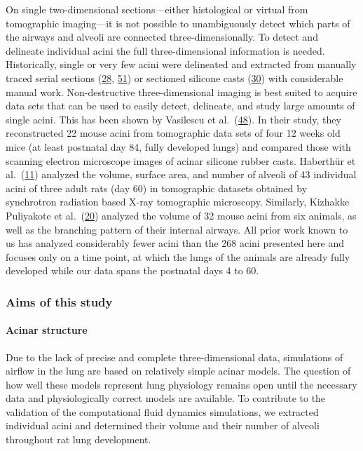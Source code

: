 \documentclass[
  american,
]{article}
\begin{document}
On single two-dimensional sections---either histological or virtual from tomographic imaging---it is not possible to unambiguously detect which parts of the airways and alveoli are connected three-dimensionally.
To detect and delineate individual acini the full three-dimensional information is needed.
Historically, single or very few acini were delineated and extracted from manually traced serial sections (\protect\hyperlink{ref-c3aIB7f9}{28}, \protect\hyperlink{ref-CPhMy3Ie}{51}) or sectioned silicone casts (\protect\hyperlink{ref-1GJECnKBu}{30}) with considerable manual work.
Non-destructive three-dimensional imaging is best suited to acquire data sets that can be used to easily detect, delineate, and study large amounts of single acini.
This has been shown by Vasilescu et al.~(\protect\hyperlink{ref-C6OaY84D}{48}).
In their study, they reconstructed 22 mouse acini from tomographic data sets of four 12 weeks old mice (at least postnatal day 84, fully developed lungs) and compared those with scanning electron microscope images of acinar silicone rubber casts.
Haberthür et al.~(\protect\hyperlink{ref-7YLeeyu}{11}) analyzed the volume, surface area, and number of alveoli of 43 individual acini of three adult rats (day 60) in tomographic datasets obtained by synchrotron radiation based X-ray tomographic microscopy.
Similarly, Kizhakke Puliyakote et al.~(\protect\hyperlink{ref-RGBeCf8v}{20}) analyzed the volume of 32 mouse acini from six animals, as well as the branching pattern of their internal airways.
All prior work known to us has analyzed considerably fewer acini than the 268 acini presented here and focuses only on a time point, at which the lungs of the animals are already fully developed while our data spans the postnatal days 4 to 60.

\hypertarget{aims-of-this-study}{%
\subsubsection{Aims of this study}\label{aims-of-this-study}}

\hypertarget{acinar-structure}{%
\paragraph{Acinar structure}\label{acinar-structure}}

Due to the lack of precise and complete three-dimensional data, simulations of airflow in the lung are based on relatively simple acinar models.
The question of how well these models represent lung physiology remains open until the necessary data and physiologically correct models are available.
To contribute to the validation of the computational fluid dynamics simulations, we extracted individual acini and determined their volume and their number of alveoli throughout rat lung development.
\end{document}
